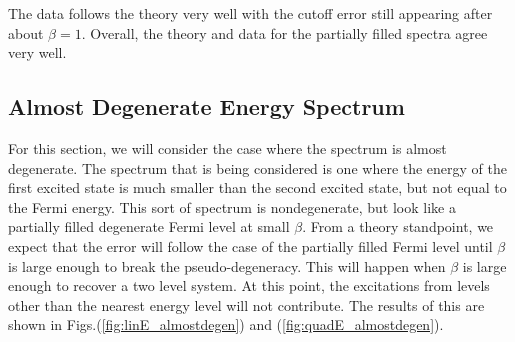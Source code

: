 

The data follows the theory very well with the cutoff error still appearing after about $\beta=1$. Overall, the theory and data for the partially filled spectra agree very well. 
\subsection{Almost Degenerate Energy Spectrum}

For this section, we will consider the case where the spectrum is almost degenerate. The spectrum that is being considered is one where the energy of the first excited state is much smaller than the second excited state, but not equal to the Fermi energy. This sort of spectrum is nondegenerate, but look like a partially filled degenerate Fermi level at small $\beta$. From a theory standpoint, we expect that the error will follow the case of the partially filled Fermi level until $\beta$ is large enough to break the pseudo-degeneracy. This will happen when $\beta$ is large enough to recover a two level system. At this point, the excitations from levels other than the nearest energy level will not contribute. The results of this are shown in Figs.\@ (\ref{fig:linE_almostdegen}) and (\ref{fig:quadE_almostdegen}). 

